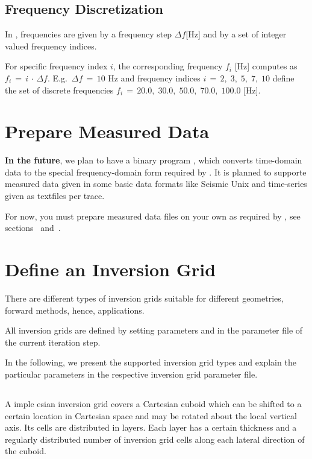 \subsection*{Frequency Discretization}
%
In \ASKI, frequencies are given by a frequency step $\Delta f$[Hz] and by a set of integer valued 
frequency indices.

For specific frequency index $i$, the corresponding frequency $f_i$ [Hz] computes as $f_i \,=\, i \,\cdot\, \Delta f$.
E.g.\ $\Delta f \,=\, 10$ Hz and frequency indices $i \,=\, 2,\; 3,\; 5,\; 7,\; 10$ define the set of 
discrete frequencies $f_i \,=\, 20.0,\; 30.0,\; 50.0,\; 70.0,\; 100.0$ [Hz].
%
\section{Prepare Measured Data} \label{basic_steps,sec:measured_data}
%
{\bf In the future}, we plan to have a binary program , which converts time-domain data 
to the special frequency-domain form required by \ASKI. It is planned to supporte measured data given in some 
basic data formats like Seismic Unix and time-series given as textfiles per trace.

For now, you must prepare measured data files on your own as required by \ASKI, see sections~ 
and~. 
%
\section{Define an Inversion Grid} \label{basic_steps,sec:invgrid}
%
There are different types of \ASKI inversion grids suitable for different geometries, 
forward methods, hence, applications.

All inversion grids are defined by setting parameters  and 
 in the parameter file of the current iteration step.

In the following, we present the supported inversion grid types and explain the particular
parameters in the respective inversion grid parameter file.
%
\subsection{} \label{basic_steps,sec:invgrid,sub:scart}
%
A imple esian inversion grid covers a Cartesian cuboid which can
be shifted to a certain location in Cartesian space and may be rotated about the local vertical
axis. Its cells are distributed in layers. Each layer has a certain thickness and a regularly
distributed number of inversion grid cells along each lateral direction of the cuboid.

